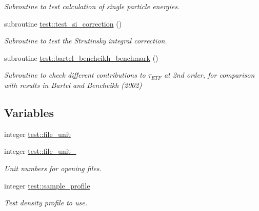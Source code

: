 \begin{DoxyCompactItemize}
\begin{DoxyCompactList}\small\item\em Subroutine to test calculation of single particle energies. \end{DoxyCompactList}\item 
subroutine \mbox{\hyperlink{namespacetest_afde013e321ba30ada173fc343ca1fa6d}{test\+::test\+\_\+si\+\_\+correction}} ()
\begin{DoxyCompactList}\small\item\em Subroutine to test the Strutinsky integral correction. \end{DoxyCompactList}\item 
subroutine \mbox{\hyperlink{namespacetest_a8eb520f312c2647e714f169e9d5b8421}{test\+::bartel\+\_\+bencheikh\+\_\+benchmark}} ()
\begin{DoxyCompactList}\small\item\em Subroutine to check different contributions to $\tau_{ETF}$ at 2nd order, for comparison with results in Bartel and Bencheikh (2002) \end{DoxyCompactList}\end{DoxyCompactItemize}
\subsection*{Variables}
\begin{DoxyCompactItemize}
\item 
integer \mbox{\hyperlink{namespacetest_a91c93b5bfe044cfbaabf6b3acfe3be00}{test\+::file\+\_\+unit}}
\item 
integer \mbox{\hyperlink{namespacetest_aed47eec898fde16ebc3dae8f3c61abef}{test\+::file\+\_\+unit\+\_}}
\begin{DoxyCompactList}\small\item\em Unit numbers for opening files. \end{DoxyCompactList}\item 
integer \mbox{\hyperlink{namespacetest_ab8cdf368336f888e9382efe275ce4d16}{test\+::sample\+\_\+profile}}
\begin{DoxyCompactList}\small\item\em Test density profile to use. \end{DoxyCompactList}\end{DoxyCompactItemize}
